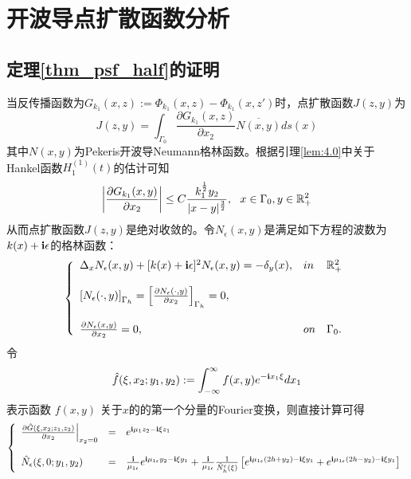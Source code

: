 \chapter{开波导点扩散函数分析}
\label{chap:req_b}
\section{定理\ref{thm_psf_half}的证明}
当反传播函数为$G_{k_1}(x,z):=\Phi_{k_1}(x,z)-\Phi_{k_1}(x,z')$时，点扩散函数$J(z,y)$为
\begin{equation}
  J(z,y)=\int_{\Gamma_0}\frac{\partial G_{k_1} (x,z)}{\partial x_2}\overline{N(x,y)}ds(x)
\end{equation}
其中$N(x,y)$为Pekeris开波导Neumann格林函数。根据引理\ref{lem:4.0}中关于Hankel函数$H_1^{(1)}(t)$的估计可知
\begin{equation}
 \left|\frac{\partial G_{k_1} (x,y)}{\partial x_2}\right|\leq C\frac{ k_1^{\frac{1}{2}}y_2}{|x-y|^{\frac{3}{2}}},\ \ x\in\Gamma_0,y\in\R^2_+
\end{equation}
从而点扩散函数$J(z,y)$是绝对收敛的。令$N_{\epsilon}(x,y)$是满足如下方程的波数为$k(x)+\mathbf{i}\epsilon$的格林函数：
\begin{eqnarray*}
\left\{
\begin{array}{lll}
  \Delta_x N_{\epsilon}(x,y)+[k(x)+\mathbf{i}\epsilon]^2N_{\epsilon}(x,y)=-\delta_y(x),&in&  \mathbb{R}_+^2\\
  & &\\
  \left[N_{\epsilon}(\cdot,y)\right]_{\Gamma_h}=\left[\frac{\partial N_{\epsilon}(\cdot,y)}{\partial x_2}\right]_{\Gamma_h}=0,\\
  & &\\
  \frac{\partial N_{\epsilon}(x,y)}{\partial x_2}=0,& on&\Gamma_0.
\end{array}
\right.
\end{eqnarray*}
令
\begin{equation}
    \hat{f}(\xi,x_2;y_1,y_2):=\int_{-\infty}^{\infty}f(x,y)e^{-\mathbf{i} x_1\xi}dx_1
\end{equation}
表示函数 $f(x,y)$ 关于$x$的的第一个分量的Fourier变换，则直接计算可得
\begin{eqnarray*}
\left\{
\begin{array}{lll}
   \frac{\partial \hat{G} (\xi,x_2;z_1,z_2)}{\partial x_2}\Big|_{x_2=0}&=&
   e^{\mathbf{i}\mu_1z_2-\mathbf{i}\xi z_1}\\
   & &\\
   \hat{N}_{\epsilon} (\xi,0;y_1,y_2)&=&\frac{\mathbf{i}}{\mu_{1\epsilon}}e^{\mathbf{i}\mu_{1\epsilon}y_2-\mathbf{i}\xi y_1}+
   \frac{\mathbf{i}}{\mu_{1\epsilon}}\frac{1}{\hat N_h^{\epsilon}(\xi)}\left[e^{\mathbf{i}\mu_{1\epsilon}(2h+y_2)-\mathbf{i}\xi y_1}+e^{\mathbf{i}\mu_{1\epsilon}(2h-y_2)-\mathbf{i}\xi y_1}\right]
\end{array}
\right.
\end{eqnarray*}
